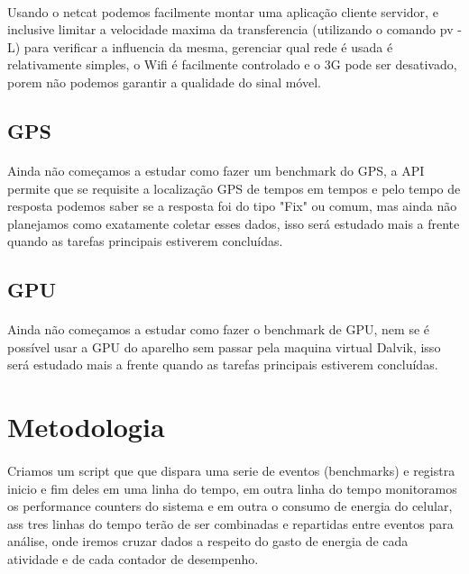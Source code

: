 \documentclass[11pt,a4paper,titlepage]{article}
\begin{document}
\paragraph{} Usando o netcat podemos facilmente montar uma aplicação cliente servidor, e inclusive limitar a velocidade maxima da transferencia (utilizando o comando pv -L) para verificar a influencia da mesma, gerenciar qual rede é usada é relativamente simples, o Wifi é facilmente controlado e o 3G pode ser desativado, porem não podemos garantir a qualidade do sinal móvel.
\subsection{GPS}
\paragraph{} Ainda não começamos a estudar como fazer um benchmark do GPS, a API permite que se requisite a localização GPS de tempos em tempos e pelo tempo de resposta podemos saber se a resposta foi do tipo "Fix" ou comum, mas ainda não planejamos como exatamente coletar esses dados, isso será estudado mais a frente quando as tarefas principais estiverem concluídas.
\subsection{GPU}
\paragraph{} Ainda não começamos a estudar como fazer o benchmark de GPU, nem se é possível usar a GPU do aparelho sem passar pela maquina virtual Dalvik, isso será estudado mais a frente quando as tarefas principais estiverem concluídas.

\section{Metodologia}
\paragraph{} Criamos um script que que dispara uma serie de eventos (benchmarks) e registra inicio e fim deles em uma linha do tempo, em outra linha do tempo monitoramos os performance counters do sistema e em outra o consumo de energia do celular, ass tres linhas do tempo terão de ser combinadas e repartidas entre eventos para análise, onde iremos cruzar dados a respeito do gasto de energia de cada atividade e de cada contador de desempenho. 
\end{document}
